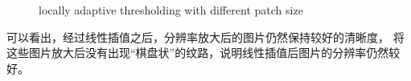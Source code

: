 \documentclass{article}
\begin{document}
\begin{figure}[]
    \caption{locally adaptive thresholding with different patch size}
\end{figure}


可以看出，经过线性插值之后，分辨率放大后的图片仍然保持较好的清晰度，
将这些图片放大后没有出现“棋盘状”的纹路，说明线性插值后图片的分辨率仍然较好。
\end{document}
